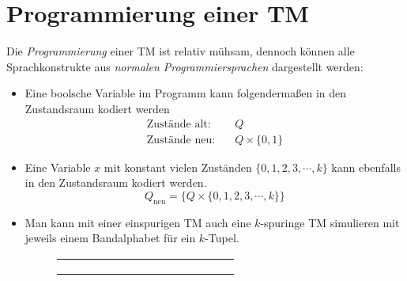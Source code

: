 \documentclass{scrartcl}%
\begin{document}
    \section*{Programmierung einer TM}
    Die \textit{Programmierung} einer TM ist relativ mühsam,
    dennoch können alle Sprachkonstrukte aus \textit{normalen Programmiersprachen} dargestellt werden:
    \begin{itemize}
        \item {Eine boolsche Variable im Programm kann folgendermaßen in den Zustandsraum kodiert werden
        \begin{equation*}
            \begin{align}
                \text{Zustände alt:} \quad & Q \\
                \text{Zustände neu:} \quad & Q \times \{0,1\}
            \end{align}
        \end{equation*}
        }
        \item {Eine Variable $x$ mit konstant vielen Zuständen $\{0,1,2,3,\cdots, k \}$ kann ebenfalls in den Zustandsraum kodiert werden.
        \begin{equation*}
            Q_{\text{neu}} = \{Q \times \{0,1,2,3,\cdots, k \} \}
        \end{equation*}
        }
        \item {Man kann mit einer einspurigen TM auch eine $k$-spuringe TM simulieren mit jeweils einem Bandalphabet für ein $k$-Tupel.
        \begin{figure}[htb]
            \centering
            \begin{tabular}{C{1em}|C{1em}|C{1em}|C{1em}|C{1em}|C{1em}|C{1em}|C{1em}|C{1em}|C{1em}|C{1em}|C{1em}|C{1em}|C{1em}}
                \hline
                & & & & & & & & & & & & & \\ \hline
                & & & & & & & & & & & & & \\ \hline
                & & & & & & & & & & & & & \\ \hline
                & & & & & & & & & & & & & \\ \hline
            \end{tabular}
        \end{figure}
        \begin{figure}[H]
            \centering
            \begin{subfigure}{0.3\textwidth}
                \raggedleft
                \begin{equation*}

\end{equation*}
\end{subfigure}
\end{figure}}
\end{itemize}
\end{document}

